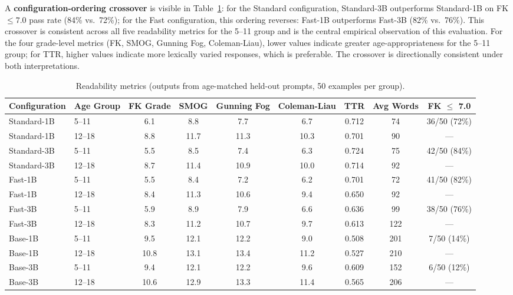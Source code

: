 \documentclass[ASNA,twocolumn]{USG} %
\begin{document}
A \textbf{configuration-ordering crossover} is visible in Table~\ref{tab:res2}: for the Standard configuration, Standard-3B outperforms Standard-1B on FK $\leq 7.0$ pass rate (84\% vs.\ 72\%); for the Fast configuration, this ordering reverses: Fast-1B outperforms Fast-3B (82\% vs.\ 76\%). This crossover is consistent across all five readability metrics for the 5--11 group and is the central empirical observation of this evaluation. For the four grade-level metrics (FK, SMOG, Gunning Fog, Coleman-Liau), lower values indicate greater age-appropriateness for the 5--11 group; for TTR, higher values indicate more lexically varied responses, which is preferable. The crossover is directionally consistent under both interpretations.

\begin{table}[!t]
  \caption{Readability metrics (outputs from age-matched held-out prompts, 50 examples per group).}
  \label{tab:res2}
  \small
  \begin{tabular}{llccccccc}
    \hline
    Configuration & Age Group & FK Grade & SMOG & Gunning Fog & Coleman-Liau & TTR & Avg Words & FK $\leq$ 7.0 \\
    \hline
    Standard-1B & 5--11  & 6.1  & 8.8  & 7.7  & 6.7  & 0.712 & 74  & 36/50 (72\%) \\
    Standard-1B & 12--18 & 8.8  & 11.7 & 11.3 & 10.3 & 0.701 & 90  & ---          \\
    Standard-3B & 5--11  & 5.5  & 8.5  & 7.4  & 6.3  & 0.724 & 75  & 42/50 (84\%) \\
    Standard-3B & 12--18 & 8.7  & 11.4 & 10.9 & 10.0 & 0.714 & 92  & ---          \\
    Fast-1B     & 5--11  & 5.5  & 8.4  & 7.2  & 6.2  & 0.701 & 72  & 41/50 (82\%) \\
    Fast-1B     & 12--18 & 8.4  & 11.3 & 10.6 & 9.4  & 0.650 & 92  & ---          \\
    Fast-3B     & 5--11  & 5.9  & 8.9  & 7.9  & 6.6  & 0.636 & 99  & 38/50 (76\%) \\
    Fast-3B     & 12--18 & 8.3  & 11.2 & 10.7 & 9.7  & 0.613 & 122 & ---          \\
    Base-1B     & 5--11  & 9.5  & 12.1 & 12.2 & 9.0  & 0.508 & 201 & 7/50 (14\%)  \\
    Base-1B     & 12--18 & 10.8 & 13.1 & 13.4 & 11.2 & 0.527 & 210 & ---          \\
    Base-3B     & 5--11  & 9.4  & 12.1 & 12.2 & 9.6  & 0.609 & 152 & 6/50 (12\%)  \\
    Base-3B     & 12--18 & 10.6 & 12.9 & 13.3 & 11.4 & 0.565 & 206 & ---          \\
    \hline
  \end{tabular}
\end{table}
\end{document}
